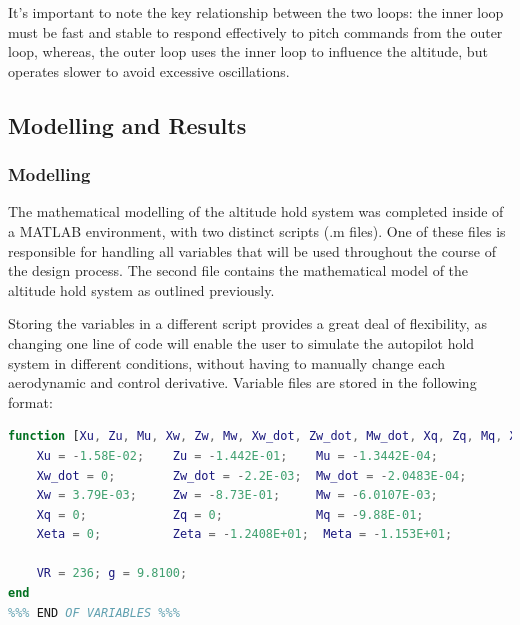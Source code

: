\documentclass[stu, a4paper, 12pt, floatsintext]{apa7}
\numberwithin{figure}{section}
\numberwithin{table}{section}
\numberwithin{equation}{section}
\begin{document}
It's important to note the key relationship between the two loops: the inner loop must be fast and stable to respond effectively to pitch commands from the outer loop, whereas, the outer loop uses the inner loop to influence the altitude, but operates slower to avoid excessive oscillations. 

\subsection{Modelling and Results}
\subsubsection{Modelling}
The mathematical modelling of the altitude hold system was completed inside of a MATLAB environment, with two distinct scripts (.m files). One of these files is responsible for handling all variables that will be used throughout the course of the design process. The second file contains the mathematical model of the altitude hold system as outlined previously. 

Storing the variables in a different script provides a great deal of flexibility, as changing one line of code will enable the user to simulate the autopilot hold system in different conditions, without having to manually change each aerodynamic and control derivative. Variable files are stored in the following format:

\begin{lstlisting}[language=MATLAB]
%%% Stability and Control Derivatives %%%
function [Xu, Zu, Mu, Xw, Zw, Mw, Xw_dot, Zw_dot, Mw_dot, Xq, Zq, Mq, Xeta, Zeta, Meta, VR, g] = final_assignment_variables()
    Xu = -1.58E-02;    Zu = -1.442E-01;    Mu = -1.3442E-04;
    Xw_dot = 0;        Zw_dot = -2.2E-03;  Mw_dot = -2.0483E-04;
    Xw = 3.79E-03;     Zw = -8.73E-01;     Mw = -6.0107E-03;
    Xq = 0;            Zq = 0;             Mq = -9.88E-01;
    Xeta = 0;          Zeta = -1.2408E+01;  Meta = -1.153E+01;
    
    VR = 236; g = 9.8100;
end
%%% END OF VARIABLES %%%
\end{lstlisting}
\end{document}
